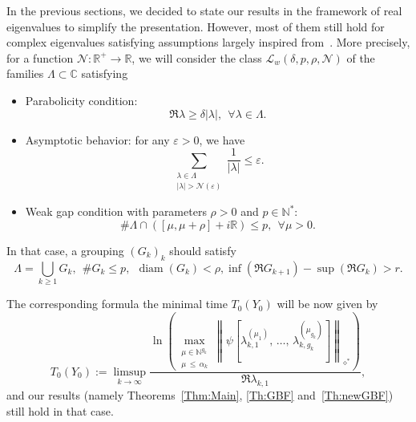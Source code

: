 \documentclass[11pt]{article}
\theoremstyle{definition}
\numberwithin{equation}{section}
\numberwithin{figure}{section}
\numberwithin{table}{section}
\newcommand{\Fzp}{Y_0}
\newcommand{\normeXalphas}[1]{\left\| #1 \right\|_{\diamond^*}}
\newcommand{\n}{g}
\newcommand{\LL}{\mathcal{L}}
\newcommand{\NN}{\mathcal{N}}
\newcommand{\N}{\mathbb{N}}
\newcommand{\R}{\mathbb{R}}
\newcommand{\C}{\mathbb{C}}
\DeclareMathOperator{\diam}{diam}
\let\oldforall\forall
\renewcommand*{\forall}{\mathrel{\oldforall}}
\begin{document}
In the previous sections, we decided to state our results in the framework of real eigenvalues to simplify the presentation. However, most of them still hold for complex eigenvalues satisfying assumptions largely inspired from~\cite{AmmarKhodjaBenabdallahGonzalez-BurgosdeTeresa:2014}. More precisely, for a function $\NN:\R^+\to \R$, we will consider the class $\LL_w(\delta,p,\rho,\NN)$ of the families $\Lambda\subset \C$ satisfying
\begin{itemize}
\item Parabolicity condition:
\[
\Re \lambda \geq \delta |\lambda|, \ \ \forall \lambda\in \Lambda.
\]
\item Asymptotic behavior: for any $\varepsilon>0$, we have
\[
\sum_{\substack{\lambda\in \Lambda\\ |\lambda|>\NN(\varepsilon)}} \frac{1}{|\lambda|} \leq \varepsilon.
\]
\item Weak gap condition with parameters $\rho>0$ and $p\in \N^*$:
\[
\# \Lambda \cap ([\mu,\mu+\rho]+i\R) \leq p, \ \ \forall \mu>0.
\]
\end{itemize}

In that case, a grouping $(G_k)_k$ should satisfy
\[
\Lambda=\bigcup_{k\geq 1} G_k, \ \ \# G_k\leq p, \ \ \diam(G_k)<\rho, \inf(\Re G_{k+1}) - \sup (\Re G_k) > r.
\]

The corresponding formula the minimal time $T_0(\Fzp)$ will be now given by
\[
T_0(\Fzp) := \limsup_{k\to \infty} \frac{\ln \left(\max\limits_{\substack{\mu\in \N^{\n_k}\\ \mu\,\leq\,\alpha_k}} \normeXalphas{\psi\left[\lambda_{k,1}^{(\mu_1)},\,\dotsc,\,\lambda_{k,\n_k}^{(\mu_{\n_k})}\right]}\right)}{\Re \lambda_{k,1}},
\]
and our results (namely Theorems~\ref{Thm:Main}, \ref{Th:GBF} and~\ref{Th:newGBF}) still hold in that case.
\end{document}

